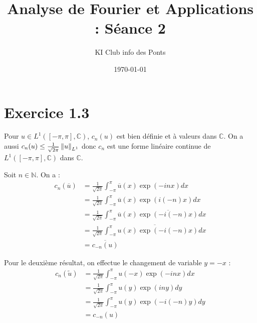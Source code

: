 \documentclass{enpc-article}
\title{\vspace{-2em}Analyse de Fourier et Applications : Séance 2}
\author{KI Club info des Ponts}
\date{\today}
\def\ens{L^1([-\pi, \pi], \mathbb{C})}
\begin{document}
\maketitle

\section*{Exercice 1.3}

Pour $u \in \ens$, $c_n(u)$ est bien définie et à valeurs dans $\mathbb{C}$.
On a aussi $c_n(u) \le \frac{1}{\sqrt{2 \pi}} \left\lVert u\right\rVert_{L^1}$ donc $c_n$ est une forme linéaire continue de $\ens$ dans $\mathbb{C}$.

Soit $n \in \mathbb{N}$. On a :
\begin{align*}
    c_n(\overline{u}) &= \frac{1}{\sqrt{2 \pi}} \int_{-\pi}^{\pi} \overline{u}(x) \exp(- i n x) dx \\
    &= \frac{1}{\sqrt{2 \pi}} \int_{-\pi}^{\pi} \overline{u}(x) \exp(i (-n) x) dx \\
    &= \frac{1}{\sqrt{2 \pi}} \int_{-\pi}^{\pi} \overline{u}(x) \overline{\exp(-i (-n) x)} dx \\
    &= \frac{1}{\sqrt{2 \pi}} \overline{\int_{-\pi}^{\pi} u(x) \exp(-i (-n) x) dx} \\
    &= \overline{c_{-n}(u)}
\end{align*}

Pour le deuxième résultat, on effectue le changement de variable $y = -x$ :
\begin{align*}
    c_n(\tilde{u}) &= \frac{1}{\sqrt{2 \pi}} \int_{-\pi}^{\pi} u(-x) \exp(- i n x) dx \\
    &= \frac{1}{\sqrt{2 \pi}} \int_{-\pi}^{\pi} u(y) \exp(i n y) dy \\
    &= \frac{1}{\sqrt{2 \pi}} \int_{-\pi}^{\pi} u(y) \exp(- i (-n) y) dy \\
    &= c_{-n}(u) \\
\end{align*}
\end{document}
